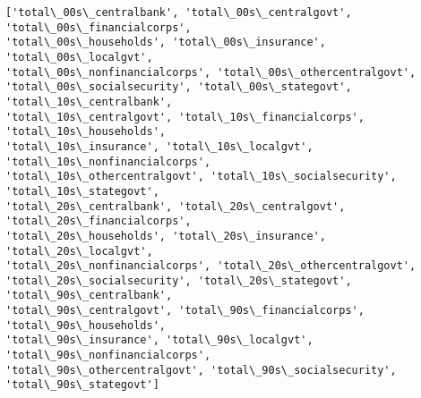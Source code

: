 \documentclass[11pt]{article}
\begin{document}
    \begin{Verbatim}[commandchars=\\\{\}]
['total\_00s\_centralbank', 'total\_00s\_centralgovt', 'total\_00s\_financialcorps',
'total\_00s\_households', 'total\_00s\_insurance', 'total\_00s\_localgvt',
'total\_00s\_nonfinancialcorps', 'total\_00s\_othercentralgovt',
'total\_00s\_socialsecurity', 'total\_00s\_stategovt', 'total\_10s\_centralbank',
'total\_10s\_centralgovt', 'total\_10s\_financialcorps', 'total\_10s\_households',
'total\_10s\_insurance', 'total\_10s\_localgvt', 'total\_10s\_nonfinancialcorps',
'total\_10s\_othercentralgovt', 'total\_10s\_socialsecurity', 'total\_10s\_stategovt',
'total\_20s\_centralbank', 'total\_20s\_centralgovt', 'total\_20s\_financialcorps',
'total\_20s\_households', 'total\_20s\_insurance', 'total\_20s\_localgvt',
'total\_20s\_nonfinancialcorps', 'total\_20s\_othercentralgovt',
'total\_20s\_socialsecurity', 'total\_20s\_stategovt', 'total\_90s\_centralbank',
'total\_90s\_centralgovt', 'total\_90s\_financialcorps', 'total\_90s\_households',
'total\_90s\_insurance', 'total\_90s\_localgvt', 'total\_90s\_nonfinancialcorps',
'total\_90s\_othercentralgovt', 'total\_90s\_socialsecurity', 'total\_90s\_stategovt']
    \end{Verbatim}
\end{document}
